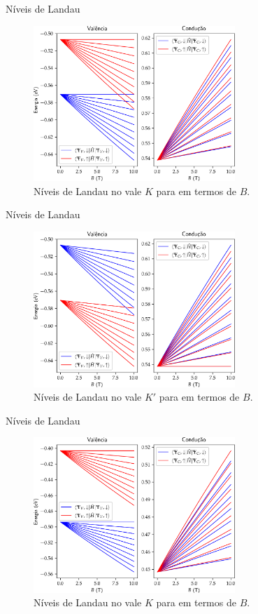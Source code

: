 \begin{frame}{Níveis de Landau}
  \begin{figure}
    \centering
    \includegraphics[width=0.68\textwidth]{imagens/crs2_k_valley_landau_levels.png}
    \caption{Níveis de Landau no vale $K$ para  em termos de $B$.}
  \end{figure}
\end{frame}

\begin{frame}{Níveis de Landau}
  \begin{figure}
    \centering
    \includegraphics[width=0.68\textwidth]{imagens/crs2_k_prime_valley_landau_levels.png}
    \caption{Níveis de Landau no vale $K'$ para  em termos de $B$.}
  \end{figure}
\end{frame}

\begin{frame}{Níveis de Landau}
  \begin{figure}
    \centering
    \includegraphics[width=0.68\textwidth]{imagens/crse2_k_valley_landau_levels.png}
    \caption{Níveis de Landau no vale $K$ para  em termos de $B$.}
  \end{figure}
\end{frame}

